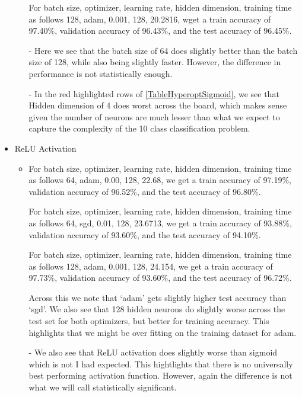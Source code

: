 \begin{solve}
\begin{itemize}
\begin{itemize}
            For batch size, optimizer, learning rate, hidden dimension, training time as follows
            128, adam, 0.001, 128, 20.2816, wget a train accuracy of 97.40\%, validation accuracy of  96.43\%, and the test accuracy of 96.45\%.

            - Here we see that the batch size of 64 does slightly better than the batch size of 128, while also being slightly faster. However, the difference in performance is not statistically enough.
            
            - In the red highlighted rows of \ref{TableHyperoptSigmoid}, we see that Hidden dimension of 4 does worst across the board, which makes sense given the number of neurons are much lesser than what we expect to capture the complexity of the 10 class classification problem. 
        \end{itemize}        

        \item  ReLU Activation
        
        \begin{itemize}
            \item For batch size, optimizer, learning rate, hidden dimension, training time as follows  
            64, adam, 0.00, 128, 22.68, we get a train accuracy of 97.19\%, validation accuracy of 96.52\%, and the test accuracy of 96.80\%.

            For batch size, optimizer, learning rate, hidden dimension, training time as follows 64, sgd, 0.01, 128, 23.6713, we get a train accuracy of  93.88\%, validation accuracy of 93.60\%, and the test accuracy of 94.10\%.
            

            For batch size, optimizer, learning rate, hidden dimension, training time as follows  
            128, adam, 0.001, 128, 24.154, we get a train accuracy of  97.73\%, validation accuracy of 93.60\%, and the test accuracy of 96.72\%.

            Across this we note that `adam' gets slightly higher test accuracy than `sgd'. We also see that 128 hidden neurons do slightly worse across the test set for both optimizers, but better for training accuracy. This highlights that we might be over fitting on the training dataset for adam. 
            
            - We also see that ReLU activation does slightly worse than sigmoid which is not I had expected. This hightlights that there is no universally best performing activation function. However, again the difference is not what we will call statistically significant.
            

\end{itemize}
\end{itemize}
\end{solve}
